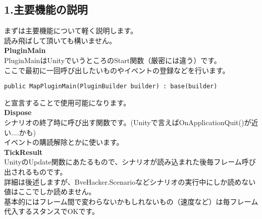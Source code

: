 \documentclass[b5paper,9pt,platex,dvipdfmx]{jsarticle}
\begin{document}
\begin{multicols*}{3}
\part*{1.主要機能の説明}
まずは主要機能について軽く説明します。\\
読み飛ばして頂いても構いません。\\
\textbf{PluginMain}\\
PluginMainはUnityでいうところのStart関数（厳密には違う）です。\\
ここで最初に一回呼び出したいものやイベントの登録などを行います。
\begin{lstlisting}[caption=Sample]
public MapPluginMain(PluginBuilder builder) : base(builder)
\end{lstlisting}
と宣言することで使用可能になります。\\
\textbf{Dispose}\\
シナリオの終了時に呼び出す関数です。(Unityで言えばOnApplicationQuit()が近い....かも)\\
イベントの購読解除とかに使います。\\
\textbf{TickResult}\\
UnityのUpdate関数にあたるもので、シナリオが読み込まれた後毎フレーム呼び出されるものです。\\
詳細は後述しますが、BveHacker.Scenarioなどシナリオの実行中にしか読めない値はここでしか読めません。\\
基本的にはフレーム間で変わらないかもしれないもの（速度など）は毎フレーム代入するスタンスでOKです。\\
\\


\end{multicols*}
\end{document}
